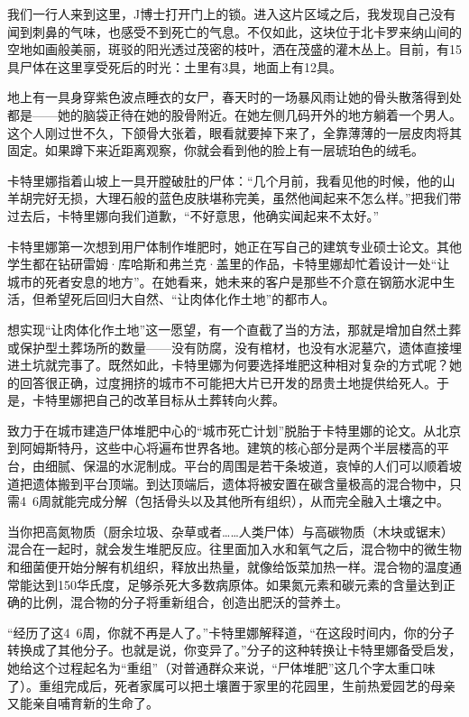 \documentclass[12pt,oneside]{book}
\begin{document}
我们一行人来到这里，J博士打开门上的锁。进入这片区域之后，我发现自己没有闻到刺鼻的气味，也感受不到死亡的气息。不仅如此，这块位于北卡罗来纳山间的空地如画般美丽，斑驳的阳光透过茂密的枝叶，洒在茂盛的灌木丛上。目前，有15具尸体在这里享受死后的时光：土里有3具，地面上有12具。

地上有一具身穿紫色波点睡衣的女尸，春天时的一场暴风雨让她的骨头散落得到处都是——她的脑袋正待在她的股骨附近。在她左侧几码开外的地方躺着一个男人。这个人刚过世不久，下颌骨大张着，眼看就要掉下来了，全靠薄薄的一层皮肉将其固定。如果蹲下来近距离观察，你就会看到他的脸上有一层琥珀色的绒毛。

卡特里娜指着山坡上一具开膛破肚的尸体：“几个月前，我看见他的时候，他的山羊胡完好无损，大理石般的蓝色皮肤堪称完美，虽然他闻起来不怎么样。”把我们带过去后，卡特里娜向我们道歉，“不好意思，他确实闻起来不太好。”

卡特里娜第一次想到用尸体制作堆肥时，她正在写自己的建筑专业硕士论文。其他学生都在钻研雷姆·库哈斯和弗兰克·盖里的作品，卡特里娜却忙着设计一处“让城市的死者安息的地方”。在她看来，她未来的客户是那些不介意在钢筋水泥中生活，但希望死后回归大自然、“让肉体化作土地”的都市人。

想实现“让肉体化作土地”这一愿望，有一个直截了当的方法，那就是增加自然土葬或保护型土葬场所的数量——没有防腐，没有棺材，也没有水泥墓穴，遗体直接埋进土坑就完事了。既然如此，卡特里娜为何要选择堆肥这种相对复杂的方式呢？她的回答很正确，过度拥挤的城市不可能把大片已开发的昂贵土地提供给死人。于是，卡特里娜把自己的改革目标从土葬转向火葬。

致力于在城市建造尸体堆肥中心的“城市死亡计划”脱胎于卡特里娜的论文。从北京到阿姆斯特丹，这些中心将遍布世界各地。建筑的核心部分是两个半层楼高的平台，由细腻、保温的水泥制成。平台的周围是若干条坡道，哀悼的人们可以顺着坡道把遗体搬到平台顶端。到达顶端后，遗体将被安置在碳含量极高的混合物中，只需4~6周就能完成分解（包括骨头以及其他所有组织），从而完全融入土壤之中。

当你把高氮物质（厨余垃圾、杂草或者……人类尸体）与高碳物质（木块或锯末）混合在一起时，就会发生堆肥反应。往里面加入水和氧气之后，混合物中的微生物和细菌便开始分解有机组织，释放出热量，就像给饭菜加热一样。混合物的温度通常能达到150华氏度，足够杀死大多数病原体。如果氮元素和碳元素的含量达到正确的比例，混合物的分子将重新组合，创造出肥沃的营养土。

“经历了这4~6周，你就不再是人了。”卡特里娜解释道，“在这段时间内，你的分子转换成了其他分子。也就是说，你变异了。”分子的这种转换让卡特里娜备受启发，她给这个过程起名为“重组”（对普通群众来说，“尸体堆肥”这几个字太重口味了）。重组完成后，死者家属可以把土壤置于家里的花园里，生前热爱园艺的母亲又能亲自哺育新的生命了。
\end{document}
